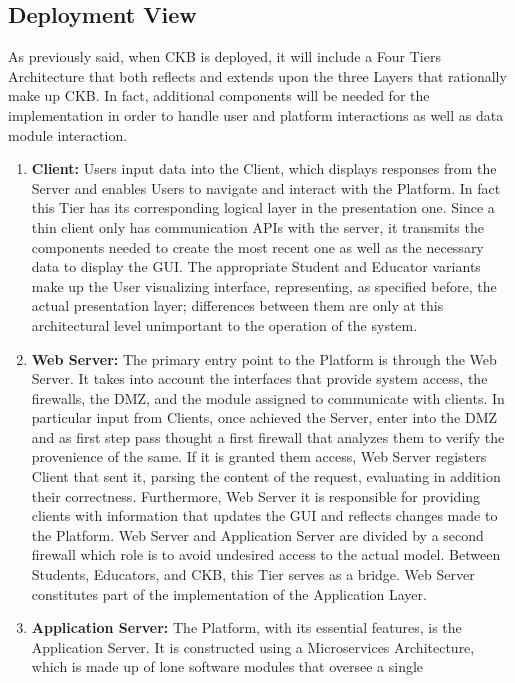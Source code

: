 \subsection{Deployment View}

As previously said, when CKB is deployed, it will include a Four Tiers Architecture that both reflects and extends upon the three Layers that rationally make up CKB.
In fact, additional components will be needed for the implementation in order to handle user and platform interactions as well as data module interaction.
\begin{enumerate}[label=$\bullet$]
    \item \textbf{Client:} Users input data into the Client, which displays responses from the Server and enables Users to navigate and interact with the Platform. In fact this Tier has its corresponding logical layer in the presentation one. 
    Since a thin client only has communication APIs with the server, it transmits the components needed to create the most recent one as well as the necessary data to display the GUI.
    The appropriate Student and Educator variants make up the User visualizing interface, representing, as specified before, the actual presentation layer; differences between them 
    are only at this architectural level unimportant to the operation of the system.
    \item \textbf{Web Server:} The primary entry point to the Platform is through the Web Server. It takes into account the interfaces that provide system access, the firewalls, the DMZ, and the module assigned to communicate with 
    clients. In particular input from Clients, once achieved the Server, enter into the DMZ and as first step pass thought a first firewall that analyzes them to verify the provenience of the same. If it is granted them access, Web Server registers Client that sent it, parsing the content of the request, evaluating in addition their correctness. 
    Furthermore, Web Server it is responsible for providing clients with information that updates the GUI and reflects changes made to the Platform. Web Server and Application Server are divided by a second firewall which role is to avoid undesired access to the actual model. Between Students, Educators, 
    and CKB, this Tier serves as a bridge. Web Server constitutes part of the implementation of the Application Layer.
    \item \textbf{Application Server:} The Platform, with its essential features, is the Application Server. It is constructed using a Microservices Architecture, which is made up of lone software modules that oversee a single 

\end{enumerate}
